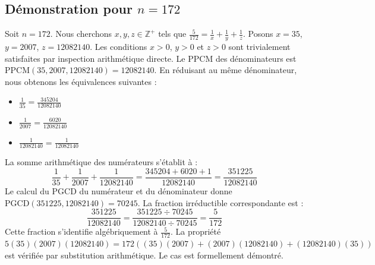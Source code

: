 \documentclass[12pt,a4paper]{article}
\begin{document}
\subsection{Démonstration pour $n = 172$}
Soit $n = 172$. Nous cherchons $x, y, z \in \mathbb{Z}^{+}$ tels que $\frac{5}{172} = \frac{1}{x} + \frac{1}{y} + \frac{1}{z}$.
Posons $x = 35$, $y = 2007$, $z = 12082140$.
Les conditions $x > 0$, $y > 0$ et $z > 0$ sont trivialement satisfaites par inspection arithmétique directe.
Le PPCM des dénominateurs est $\text{PPCM}(35, 2007, 12082140) = 12082140$.
En réduisant au même dénominateur, nous obtenons les équivalences suivantes :
\begin{itemize}
    \item $\frac{1}{35} = \frac{345204}{12082140}$
    \item $\frac{1}{2007} = \frac{6020}{12082140}$
    \item $\frac{1}{12082140} = \frac{1}{12082140}$
\end{itemize}
La somme arithmétique des numérateurs s'établit à :
$$ \frac{1}{35} + \frac{1}{2007} + \frac{1}{12082140} = \frac{345204 + 6020 + 1}{12082140} = \frac{351225}{12082140} $$
Le calcul du PGCD du numérateur et du dénominateur donne $\text{PGCD}(351225, 12082140) = 70245$.
La fraction irréductible correspondante est :
$$ \frac{351225}{12082140} = \frac{351225 \div 70245}{12082140 \div 70245} = \frac{5}{172} $$
Cette fraction s'identifie algébriquement à $\frac{5}{172}$.
La propriété $5(35)(2007)(12082140) = 172((35)(2007) + (2007)(12082140) + (12082140)(35))$ est vérifiée par substitution arithmétique.
Le cas est formellement démontré.
\end{document}
